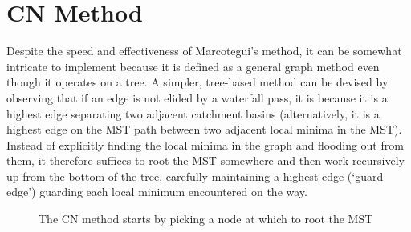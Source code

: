 \documentclass[preprint,a4paper]{elsarticle}
\newenvironment{stusubfig}[1]
{
	\begin{figure}[#1]
	\begin{center}
}
{
	\end{center}
	\end{figure}
}
\begin{document}
\section{CN Method}
\label{sec:nicholls}

Despite the speed and effectiveness of Marcotegui's method, it can be somewhat intricate to implement \cite{golodetz08} because it is defined as a general graph method even though it operates on a tree. A simpler, tree-based method can be devised by observing that if an edge is not elided by a waterfall pass, it is because it is a highest edge separating two adjacent catchment basins (alternatively, it is a highest edge on the MST path between two adjacent local minima in the MST). Instead of explicitly finding the local minima in the graph and flooding out from them, it therefore suffices to root the MST somewhere and then work recursively up from the bottom of the tree, carefully maintaining a highest edge (`guard edge') guarding each local minimum encountered on the way.

\begin{stusubfig}{p}
	\hspace{4mm}%
\caption{The CN method starts by picking a node at which to root the MST}%
\label{fig:segmentation-waterfall-nicholls-root}
\end{stusubfig}
\end{document}
